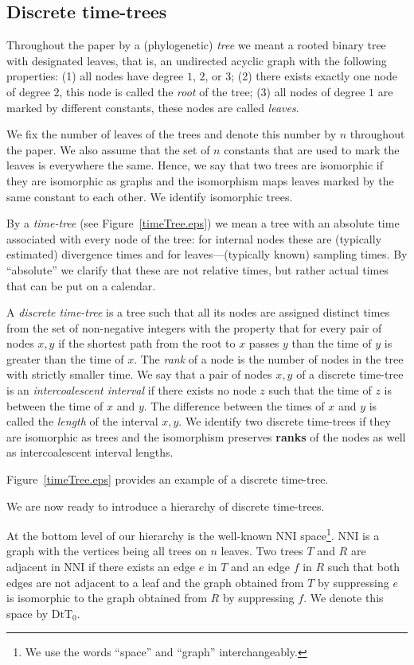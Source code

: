 \documentclass{amsart}
\theoremstyle{definition}
\newcommand{\nni}{\mathrm{NNI}}
\newcommand{\dtt}{\mathrm{DtT}}
\begin{document}
\subsection{Discrete time-trees}
Throughout the paper by a (phylogenetic) {\em tree} we meant a rooted binary tree with designated leaves, that is, an undirected acyclic graph with the following properties:
(1) all nodes have degree $1$, $2$, or $3$; (2) there exists exactly one node of degree $2$, this node is called the {\em root} of the tree; (3) all nodes of degree $1$ are marked by different constants, these nodes are called {\em leaves}.

We fix the number of leaves of the trees and denote this number by $n$ throughout the paper.
We also assume that the set of $n$ constants that are used to mark the leaves is everywhere the same.
Hence, we say that two trees are isomorphic if they are isomorphic as graphs and the isomorphism maps leaves marked by the same constant to each other.
We identify isomorphic trees.

By a {\em time-tree} (see Figure~\ref{timeTree.eps}) we mean a tree with an absolute time associated with every node of the tree: for internal nodes these are (typically estimated) divergence times and for leaves---(typically known) sampling times.
By ``absolute'' we clarify that these are not relative times, but rather actual times that can be put on a calendar.

A {\em discrete time-tree} is a tree such that all its nodes are assigned distinct times from the set of non-negative integers with the property that for every pair of nodes $x,y$ if the shortest path from the root to $x$ passes $y$ than the time of $y$ is greater than the time of $x$.
The {\em rank} of a node is the number of nodes in the tree with strictly smaller time.
We say that a pair of nodes $x,y$ of a discrete time-tree is an {\em intercoalescent interval} if there exists no node $z$ such that the time of $z$ is between the time of $x$ and $y$.
The difference between the times of $x$ and $y$ is called the {\em length} of the interval $x,y$.
We identify two discrete time-trees if they are isomorphic as trees and the isomorphism preserves \textbf{ranks} of the nodes as well as intercoalescent interval lengths.

Figure~\ref{timeTree.eps} provides an example of a discrete time-tree.

We are now ready to introduce a hierarchy of discrete time-trees.

At the bottom level of our hierarchy is the well-known $\nni$ space\footnote{We use the words ``space'' and ``graph'' interchangeably.}.
$\nni$ is a graph with the vertices being all trees on $n$ leaves.
Two trees $T$ and $R$ are adjacent in $\nni$ if there exists an edge $e$ in $T$ and an edge $f$ in $R$ such that both edges are not adjacent to a leaf and the graph obtained from $T$ by suppressing $e$ is isomorphic to the graph obtained from $R$ by suppressing $f$.
We denote this space by $\dtt_0$.
\end{document}
